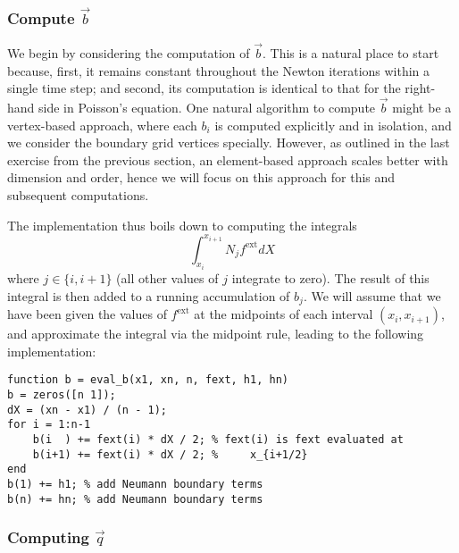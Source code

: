 \vspace{.5\baselineskip}
\subsubsection{Compute $\vec{b}$}

We begin by considering the computation of $\vec{b}$. This is a natural place to start because, first, it remains constant throughout the Newton iterations within a single time step; and second, its computation is identical to that for the right-hand side in Poisson's equation. One natural algorithm to compute $\vec{b}$ might be a vertex-based approach, where each $b_i$ is computed explicitly and in isolation, and we consider the boundary grid vertices specially. However, as outlined in the last exercise from the previous section, an element-based approach scales better with dimension and order, hence we will focus on this approach for this and subsequent computations.

The implementation thus boils down to computing the integrals
\begin{equation*}
\int_{x_i}^{x_{i+1}} N_j f^{\text{ext}} dX
\end{equation*}
where $j \in \{i, i+1\}$ (all other values of $j$ integrate to zero). The result of this integral is then added to a running accumulation of $b_j$. We will assume that we have been given the values of $f^{\text{ext}}$ at the midpoints of each interval $\left( x_i, x_{i+1} \right)$, and approximate the integral via the midpoint rule, leading to the following implementation:

\begin{verbatim}
function b = eval_b(x1, xn, n, fext, h1, hn)
b = zeros([n 1]);
dX = (xn - x1) / (n - 1);
for i = 1:n-1
    b(i  ) += fext(i) * dX / 2; % fext(i) is fext evaluated at
    b(i+1) += fext(i) * dX / 2; %     x_{i+1/2}
end
b(1) += h1; % add Neumann boundary terms
b(n) += hn; % add Neumann boundary terms
\end{verbatim}

\vspace{.5\baselineskip}
\subsubsection{Computing $\vec{q}$}

